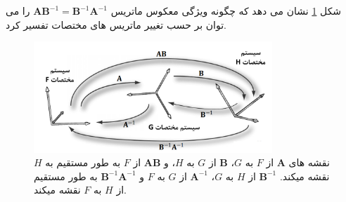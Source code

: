 {\begin{spacing}{1.5}
        شکل \ref{fig:4.Session.1.3.14} نشان می دهد که چگونه ویژگی معکوس ماتریس $\textbf{AB}^{-1}=\textbf{B}^{-1}\textbf{A}^{-1}$ را می توان بر حسب تغییر ماتریس های مختصات تفسیر کرد.

        \begin{figure}[H]
            \centering
            \setlength{\belowcaptionskip}{-10pt}
            \includegraphics[width=0.8\textwidth]{Images/4/3/4.Session.1.3.14}
            \caption {نقشه های $\textbf{A}$ از $F$ به $G$، $\textbf{B}$ از $G$ به $H$، و $\textbf{AB}$ از $F$ به طور مستقیم به $H$ نقشه میکند. $\textbf{B}^{-1}$ از $H$ به $G$، $\textbf{A}^{-1}$ از $G$ به $F$ و $\textbf{B}^{-1}\textbf{A}^{-1}$ به طور مستقیم از $H$ به $F$ نقشه میکند.}
            \label{fig:4.Session.1.3.14}
        \end{figure}
    \end{spacing}
}


